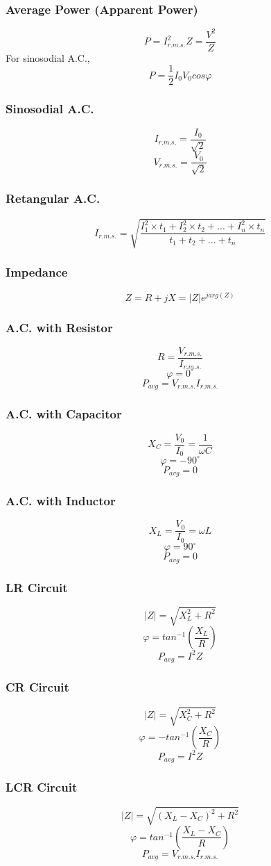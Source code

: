 \documentclass{article}
\begin{document}
\subsubsection*{Average Power (Apparent Power)}
\[P=I_{r.m.s.}^2Z=\frac{V^2}{Z}\]
For sinosodial A.C.,
\[P=\frac{1}{2}I_0V_0cos\varphi\]

\subsubsection*{Sinosodial A.C.}
\[I_{r.m.s.}=\frac{I_0}{\sqrt{2}}\]
\[V_{r.m.s.}=\frac{V_0}{\sqrt{2}}\]

\subsubsection*{Retangular A.C.}
\[I_{r.m.s.}=\sqrt{\frac{I_1^2\times t_1+I_2^2\times t_2+...+I_n^2\times t_n}{t_1+t_2+...+t_n}}\]

\subsubsection{Impedance}
\[Z=R+jX=|Z|e^{jarg(Z)}\]

\subsubsection*{A.C. with Resistor}
\[R=\frac{V_{r.m.s.}}{I_{r.m.s.}}\]
\[\varphi=0^{\circ}\]
\[P_{avg}=V_{r.m.s.}I_{r.m.s.}\]

\subsubsection*{A.C. with Capacitor}
\[X_C=\frac{V_0}{I_0}=\frac{1}{\omega C}\]
\[\varphi=-90^{\circ}\]
\[P_{avg}=0\]

\subsubsection*{A.C. with Inductor}
\[X_L=\frac{V_0}{I_0}=\omega L\]
\[\varphi=90^{\circ}\]
\[P_{avg}=0\]

\subsubsection*{LR Circuit}
\[|Z|=\sqrt{X_L^2+R^2}\]
\[\varphi=tan^{-1}(\frac{X_L}{R})\]
\[P_{avg}=I^2Z\]

\subsubsection*{CR Circuit}
\[|Z|=\sqrt{X_C^2+R^2}\]
\[\varphi=-tan^{-1}(\frac{X_C}{R})\]
\[P_{avg}=I^2Z\]

\subsubsection*{LCR Circuit}
\[|Z|=\sqrt{(X_L-X_C)^2+R^2}\]
\[\varphi=tan^{-1}(\frac{X_L-X_C}{R})\]
\[P_{avg}=V_{r.m.s.}I_{r.m.s.}\]
\end{document}
